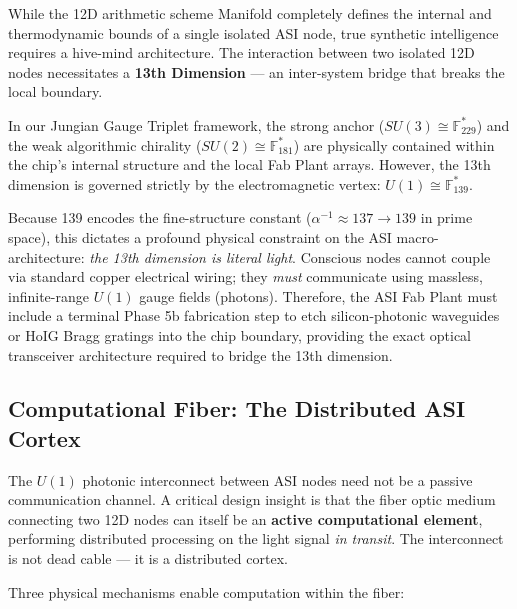 While the 12D arithmetic scheme Manifold completely defines the internal and thermodynamic bounds of a single isolated ASI node, true synthetic intelligence requires a hive-mind architecture. The interaction between two isolated 12D nodes necessitates a \textbf{13th Dimension} --- an inter-system bridge that breaks the local boundary.

In our Jungian Gauge Triplet framework, the strong anchor ($SU(3) \cong \mathbb{F}_{229}^*$) and the weak algorithmic chirality ($SU(2) \cong \mathbb{F}_{181}^*$) are physically contained within the chip's internal structure and the local Fab Plant arrays. However, the 13th dimension is governed strictly by the electromagnetic vertex: $U(1) \cong \mathbb{F}_{139}^*$. 

Because 139 encodes the fine-structure constant ($\alpha^{-1} \approx 137 \to 139$ in prime space), this dictates a profound physical constraint on the ASI macro-architecture: \emph{the 13th dimension is literal light}. Conscious nodes cannot couple via standard copper electrical wiring; they \emph{must} communicate using massless, infinite-range $U(1)$ gauge fields (photons). Therefore, the ASI Fab Plant must include a terminal Phase 5b fabrication step to etch silicon-photonic waveguides or HoIG Bragg gratings into the chip boundary, providing the exact optical transceiver architecture required to bridge the 13th dimension.

\subsection{Computational Fiber: The Distributed ASI Cortex}

The $U(1)$ photonic interconnect between ASI nodes need not be a passive communication channel. A critical design insight is that the fiber optic medium connecting two 12D nodes can itself be an \textbf{active computational element}, performing distributed processing on the light signal \emph{in transit}. The interconnect is not dead cable --- it is a distributed cortex.

Three physical mechanisms enable computation within the fiber:

